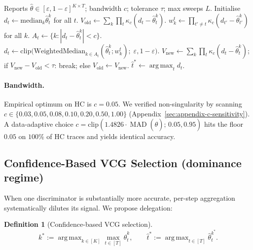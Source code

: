 \documentclass[11pt]{article}
\newtheorem{definition}[theorem]{Definition}
\DeclareMathOperator*{\argmax}{arg\,max}
\DeclareMathOperator{\MAD}{MAD}
\newcommand{\thetahat}{\hat{\theta}}
\begin{document}
\begin{algorithm}[H]
\caption{L1-Huber Multiplicative VCG (Phase 1b, $R = 0$)}
\label{alg:l1huber}
\begin{algorithmic}[1]
\Require Reports $\thetahat \in [\varepsilon, 1{-}\varepsilon]^{K \times T}$; bandwidth $c$; tolerance $\tau$; max sweeps $L$.
\State Initialise $d_t \gets \mathrm{median}_k \thetahat^k_t$ for all $t$.
\State $V_{\text{old}} \gets \sum_k \prod_t \kappa_c(d_t - \thetahat^k_t)$.
    \State $w^t_k \gets \prod_{t' \neq t} \kappa_c(d_{t'} - \thetahat^k_{t'})$ for all $k$.
    \State $A_t \gets \{k : |d_t - \thetahat^k_t| < c\}$.
      \State $d_t \gets \mathrm{clip}\!\big(\mathrm{WeightedMedian}_{k \in A_t}(\thetahat^k_t; w^t_k);\; \varepsilon, 1{-}\varepsilon\big)$.
    \EndIf
  \EndFor
  \State $V_{\text{new}} \gets \sum_k \prod_t \kappa_c(d_t - \thetahat^k_t)$;
         if $V_{\text{new}} - V_{\text{old}} < \tau$: break; else $V_{\text{old}} \gets V_{\text{new}}$.
\EndFor
\State \Return $\hat t^* \gets \argmax_t d_t$.
\end{algorithmic}
\end{algorithm}

\paragraph{Bandwidth.} Empirical optimum on HC is $c = 0.05$. We verified
non-singularity by scanning $c \in \{0.03, 0.05, 0.08, 0.10, 0.20, 0.50, 1.00\}$
(Appendix~\ref{sec:appendix-c-sensitivity}). A data-adaptive choice
$c = \mathrm{clip}(1.4826 \cdot \MAD(\thetahat);\, 0.05, 0.95)$
hits the floor $0.05$ on $100\%$ of HC traces and yields identical
accuracy.

\subsection{Confidence-Based VCG Selection (dominance regime)}

When one discriminator is substantially more accurate, per-step
aggregation systematically dilutes its signal. We propose delegation:

\begin{definition}[Confidence-based VCG selection]
\[
k^* := \argmax_{k \in [K]} \max_{t \in [T]} \thetahat^k_t,
\qquad
\hat t^* := \argmax_{t \in [T]} \thetahat^{k^*}_t.
\]
\end{definition}
\end{document}
